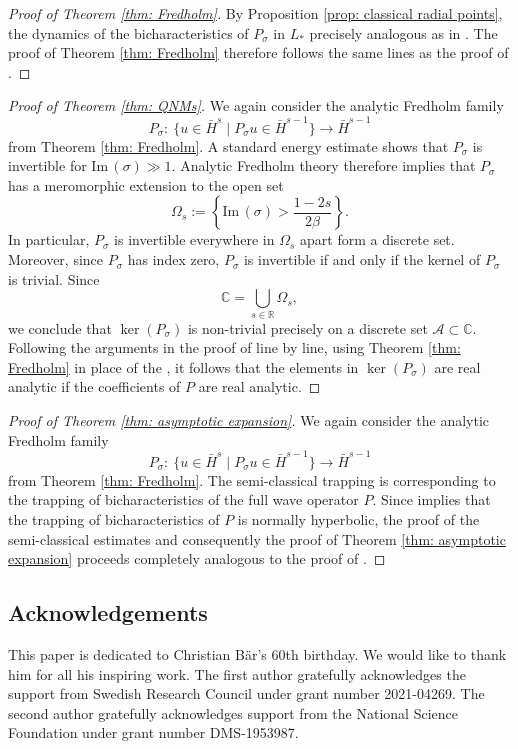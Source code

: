 \documentclass[10pt,a4paper]{amsart}
\renewcommand{\Im}{\mathrm{Im} \,}
\newcommand{\A}{\mathcal A}
\renewcommand{\b}{\beta}
\newcommand{\s}{\sigma}
\newcommand{\R}[0]{\mathbb{R}}
\newcommand{\C}[0]{\mathbb{C}}
\numberwithin{equation}{section}
\begin{document}
\begin{proof}[Proof of Theorem \ref{thm: Fredholm}]
By Proposition \ref{prop: classical radial points}, the dynamics of the bicharacteristics of $P_\s$ in $L_*$ precisely analogous as in \cite[Section~6.1]{V2013}.
The proof of Theorem \ref{thm: Fredholm} therefore follows the same lines as the proof of \cite[Theorem~1.4]{V2013}.
\end{proof}



\begin{proof}[Proof of Theorem \ref{thm: QNMs}]
We again consider the analytic Fredholm family
\[
  P_\s\colon\ \big\{u \in \bar H^s \mid P_\s u \in \bar H^{s-1} \big\} \to \bar H^{s-1}
\]
from Theorem \ref{thm: Fredholm}.
A standard energy estimate shows that $P_\s$ is invertible for $\Im(\s) \gg 1$.
Analytic Fredholm theory therefore implies that $P_\s$ has a meromorphic extension to the open set
\[
	\Omega_s
		:= \left\{ \Im (\s) > \frac{1 - 2s}{2\b} \right\}.
\]
In particular, $P_\s$ is invertible everywhere in $\Omega_s$ apart form a discrete set.
Moreover, since $P_\s$ has index zero, $P_\s$ is invertible if and only if the kernel of $P_\s$ is trivial.
Since
\[
	\C = \bigcup_{s \in \R} \Omega_s,
\]
we conclude that $\ker(P_\s)$ is non-trivial precisely on a discrete set $\A \subset \C$.
Following the arguments in the proof of \cite[Theorem~1.2]{PV2021} line by line, using Theorem \ref{thm: Fredholm} in place of the \cite[Theorem~1.1]{V2013}, it follows that the elements in $\ker(P_\s)$ are real analytic if the coefficients of $P$ are real analytic.
\end{proof}

\begin{proof}[Proof of Theorem \ref{thm: asymptotic expansion}]
We again consider the analytic Fredholm family
\[
  P_\s\colon\ \big\{u \in \bar H^s \mid P_\s u \in \bar H^{s-1} \big\} \to \bar H^{s-1}
\]
from Theorem \ref{thm: Fredholm}.
The semi-classical trapping is corresponding to the trapping of bicharacteristics of the full wave operator $P$.
Since \cite[Theorem~3.2]{PV2023} implies that the trapping of bicharacteristics of $P$ is normally hyperbolic, the proof of the semi-classical estimates and consequently the proof of Theorem \ref{thm: asymptotic expansion} proceeds completely analogous to the proof of \cite[Theorem~1.4]{V2013}.
\end{proof}


\subsection*{Acknowledgements}
This paper is dedicated to Christian B\"ar's 60th birthday.
We would like to thank him for all his inspiring work.
The first author gratefully acknowledges the support from Swedish Research Council under grant number 2021-04269.
The second author gratefully acknowledges support from the National Science Foundation under grant number DMS-1953987.
\end{document}
